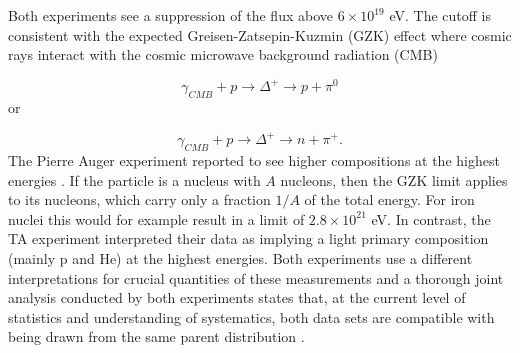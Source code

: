 Both experiments see a suppression of the flux above $6 \times 10^{19}$ eV. The cutoff is consistent with the expected Greisen-Zatsepin-Kuzmin (GZK) effect \cite{Greisen:1966jv,Zatsepin:1966jv} where cosmic rays interact with the cosmic microwave background radiation (CMB)

\begin{equation}
\gamma_{CMB} + p \rightarrow \Delta^+ \rightarrow p + \pi^0
\end{equation} 
or

\begin{equation}
\gamma_{CMB} + p \rightarrow \Delta^+ \rightarrow n + \pi^+.
\end{equation}
The Pierre Auger experiment reported to see higher compositions at the highest energies \cite{icrc2017:pa}. If the particle is a nucleus with $A$ nucleons, then the GZK limit applies to its nucleons, which carry only a fraction $1/A$ of the total energy. For iron nuclei this would for example result in a limit of $2.8 \times 10^{21}$ eV. In contrast, the TA experiment interpreted their data as implying a light primary composition (mainly p and He) at the highest energies. Both experiments use a different interpretations for crucial quantities of these measurements and a thorough joint analysis conducted by both experiments states that, at the current level of statistics and understanding of systematics, both data sets are compatible with being drawn from the same parent distribution \cite{PDG2018url}.

